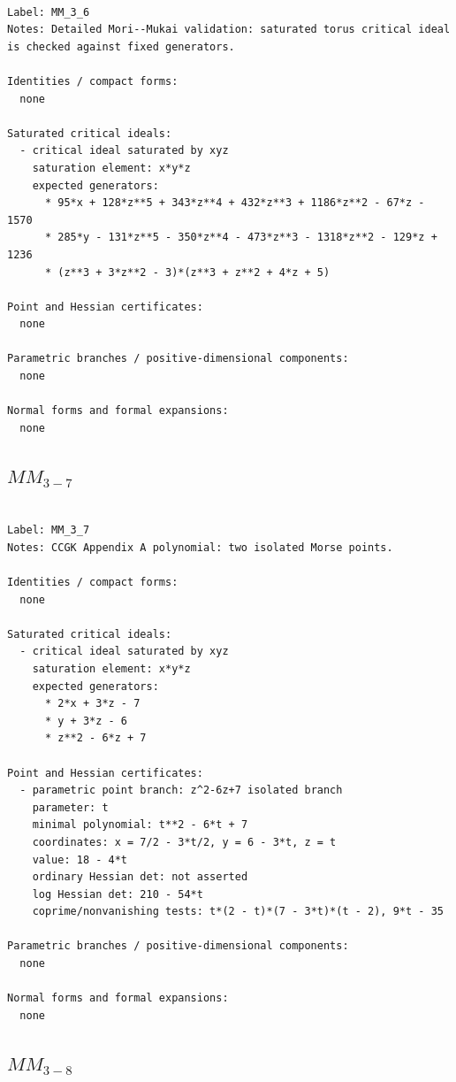 \documentclass[10pt,a4paper]{article}
\begin{document}
\begin{lstlisting}

Label: MM_3_6
Notes: Detailed Mori--Mukai validation: saturated torus critical ideal is checked against fixed generators.

Identities / compact forms:
  none

Saturated critical ideals:
  - critical ideal saturated by xyz
    saturation element: x*y*z
    expected generators:
      * 95*x + 128*z**5 + 343*z**4 + 432*z**3 + 1186*z**2 - 67*z - 1570
      * 285*y - 131*z**5 - 350*z**4 - 473*z**3 - 1318*z**2 - 129*z + 1236
      * (z**3 + 3*z**2 - 3)*(z**3 + z**2 + 4*z + 5)

Point and Hessian certificates:
  none

Parametric branches / positive-dimensional components:
  none

Normal forms and formal expansions:
  none

\end{lstlisting}

\subsection*{$ MM_{3-7} $}

\begin{lstlisting}

Label: MM_3_7
Notes: CCGK Appendix A polynomial: two isolated Morse points.

Identities / compact forms:
  none

Saturated critical ideals:
  - critical ideal saturated by xyz
    saturation element: x*y*z
    expected generators:
      * 2*x + 3*z - 7
      * y + 3*z - 6
      * z**2 - 6*z + 7

Point and Hessian certificates:
  - parametric point branch: z^2-6z+7 isolated branch
    parameter: t
    minimal polynomial: t**2 - 6*t + 7
    coordinates: x = 7/2 - 3*t/2, y = 6 - 3*t, z = t
    value: 18 - 4*t
    ordinary Hessian det: not asserted
    log Hessian det: 210 - 54*t
    coprime/nonvanishing tests: t*(2 - t)*(7 - 3*t)*(t - 2), 9*t - 35

Parametric branches / positive-dimensional components:
  none

Normal forms and formal expansions:
  none

\end{lstlisting}

\subsection*{$ MM_{3-8} $}
\end{document}
